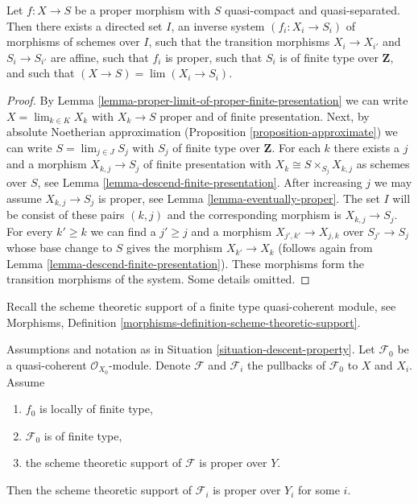 \begin{lemma}
\label{lemma-proper-limit-of-proper-finite-presentation-noetherian}
Let $f : X \to S$ be a proper morphism with $S$ quasi-compact and
quasi-separated. Then there exists a directed set $I$, an
inverse system $(f_i : X_i \to S_i)$ of morphisms of schemes over $I$,
such that the transition morphisms $X_i \to X_{i'}$ and $S_i \to S_{i'}$
are affine, such that $f_i$ is proper, such that $S_i$ is of finite
type over $\mathbf{Z}$, and such that
$(X \to S) = \lim (X_i \to S_i)$.
\end{lemma}

\begin{proof}
By Lemma \ref{lemma-proper-limit-of-proper-finite-presentation}
we can write $X = \lim_{k \in K} X_k$ with $X_k \to S$ proper and
of finite presentation. Next, by absolute Noetherian approximation
(Proposition \ref{proposition-approximate}) we can
write $S = \lim_{j \in J} S_j$ with $S_j$ of finite type over $\mathbf{Z}$.
For each $k$ there exists a $j$ and a morphism $X_{k, j} \to S_j$
of finite presentation with $X_k \cong S \times_{S_j} X_{k, j}$
as schemes over $S$, see
Lemma \ref{lemma-descend-finite-presentation}.
After increasing $j$ we may assume $X_{k, j} \to S_j$ is proper, see
Lemma \ref{lemma-eventually-proper}. The set $I$ will be consist
of these pairs $(k, j)$ and the corresponding morphism is $X_{k, j} \to S_j$.
For every $k' \geq k$ we can find a $j' \geq j$ and a morphism
$X_{j', k'} \to X_{j, k}$ over $S_{j'} \to S_j$ whose base change to $S$
gives the morphism $X_{k'} \to X_k$ (follows again from
Lemma \ref{lemma-descend-finite-presentation}).
These morphisms form the transition morphisms of the system. Some details
omitted.
\end{proof}

\noindent
Recall the scheme theoretic support of
a finite type quasi-coherent module, see
Morphisms, Definition \ref{morphisms-definition-scheme-theoretic-support}.

\begin{lemma}
\label{lemma-eventually-proper-support}
Assumptions and notation as in Situation \ref{situation-descent-property}.
Let $\mathcal{F}_0$ be a quasi-coherent $\mathcal{O}_{X_0}$-module.
Denote $\mathcal{F}$ and $\mathcal{F}_i$ the pullbacks of
$\mathcal{F}_0$ to $X$ and $X_i$. Assume
\begin{enumerate}
\item $f_0$ is locally of finite type,
\item $\mathcal{F}_0$ is of finite type,
\item the scheme theoretic support of $\mathcal{F}$ is proper over $Y$.
\end{enumerate}
Then the scheme theoretic support of $\mathcal{F}_i$ is proper over $Y_i$
for some $i$.
\end{lemma}

